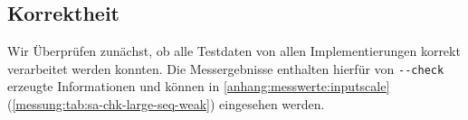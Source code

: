\subsection{\sa Korrektheit}

Wir Überprüfen zunächst, ob alle Testdaten von allen Implementierungen
korrekt verarbeitet werden konnten. Die Messergebnisse enthalten hierfür von \texttt{-{}-check} erzeugte Informationen und können in \cref{anhang:messwerte:inputscale} (\cref{messung:tab:sa-chk-large-seq-weak}) eingesehen werden.
